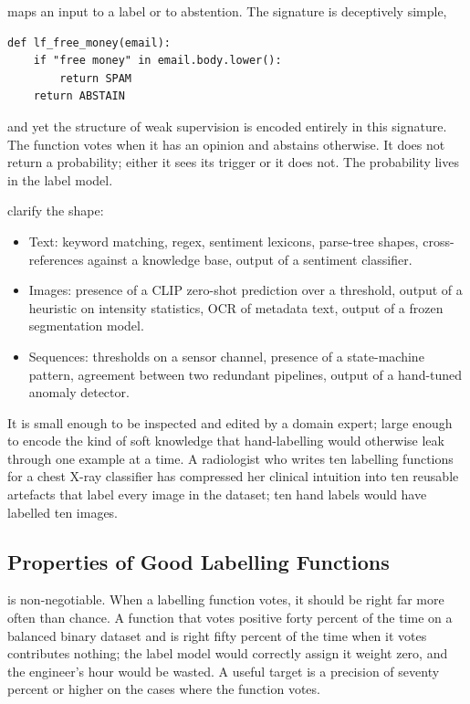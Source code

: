  maps an input to a label or to abstention. The signature is deceptively simple,
\begin{verbatim}
def lf_free_money(email):
    if "free money" in email.body.lower():
        return SPAM
    return ABSTAIN
\end{verbatim}
and yet the structure of weak supervision is encoded entirely in this signature. The function votes when it has an opinion and abstains otherwise. It does not return a probability; either it sees its trigger or it does not. The probability lives in the label model.

 clarify the shape:
\begin{itemize}
    \item Text: keyword matching, regex, sentiment lexicons, parse-tree shapes, cross-references against a knowledge base, output of a sentiment classifier.
    \item Images: presence of a CLIP zero-shot prediction over a threshold, output of a heuristic on intensity statistics, OCR of metadata text, output of a frozen segmentation model.
    \item Sequences: thresholds on a sensor channel, presence of a state-machine pattern, agreement between two redundant pipelines, output of a hand-tuned anomaly detector.
\end{itemize}

 It is small enough to be inspected and edited by a domain expert; large enough to encode the kind of soft knowledge that hand-labelling would otherwise leak through one example at a time. A radiologist who writes ten labelling functions for a chest X-ray classifier has compressed her clinical intuition into ten reusable artefacts that label every image in the dataset; ten hand labels would have labelled ten images.

\subsection{Properties of Good Labelling Functions}

 is non-negotiable. When a labelling function votes, it should be right far more often than chance. A function that votes positive forty percent of the time on a balanced binary dataset and is right fifty percent of the time when it votes contributes nothing; the label model would correctly assign it weight zero, and the engineer's hour would be wasted. A useful target is a precision of seventy percent or higher on the cases where the function votes.

